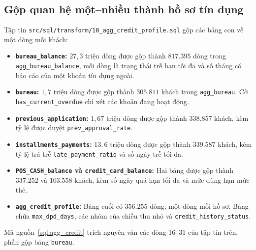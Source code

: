 \subsection{Gộp quan hệ một--nhiều thành hồ sơ tín dụng}
Tập tin \texttt{src/sql/transform/10\_agg\_credit\_profile.sql} gộp các bảng con về một dòng mỗi khách:
\begin{itemize}[topsep=0pt, itemsep=1pt]
	\item \textbf{\texttt{bureau\_balance}:} $27{,}3$ triệu dòng được gộp thành $817.395$ dòng trong \texttt{agg\_bureau\_balance}, mỗi dòng là trạng thái trễ hạn tối đa và số tháng có báo cáo của một khoản tín dụng ngoài.
	\item \textbf{\texttt{bureau}:} $1{,}7$ triệu dòng được gộp thành $305.811$ khách trong \texttt{agg\_bureau}. Cờ \texttt{has\_current\_overdue} chỉ xét các khoản đang hoạt động.
	\item \textbf{\texttt{previous\_application}:} $1{,}67$ triệu dòng được gộp thành $338.857$ khách, kèm tỷ lệ được duyệt \texttt{prev\_approval\_rate}.
	\item \textbf{\texttt{installments\_payments}:} $13{,}6$ triệu dòng được gộp thành $339.587$ khách, kèm tỷ lệ trả trễ \texttt{late\_payment\_ratio} và số ngày trễ tối đa.
	\item \textbf{\texttt{POS\_CASH\_balance} và \texttt{credit\_card\_balance}:} Hai bảng được gộp thành $337.252$ và $103.558$ khách, kèm số ngày quá hạn tối đa và mức dùng hạn mức thẻ.
	\item \textbf{\texttt{agg\_credit\_profile}:} Bảng cuối có $356.255$ dòng, một dòng mỗi hồ sơ. Bảng chứa \texttt{max\_dpd\_days}, các nhóm của chiều thu nhỏ và \texttt{credit\_history\_status}.
\end{itemize}

Mã nguồn~\ref{sql:agg_credit} trích nguyên văn các dòng $16$--$31$ của tập tin trên, phần gộp bảng \texttt{bureau}.

